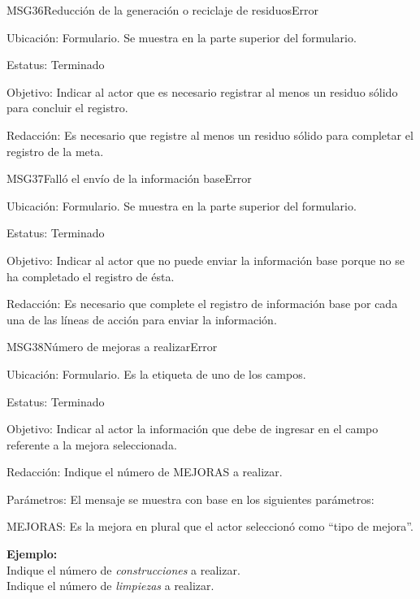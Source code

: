 \begin{mensaje}{MSG36}{Reducción de la generación o reciclaje de residuos}{Error}
\item[Ubicación:] Formulario. Se muestra en la parte superior del formulario.
\item[Estatus:] Terminado
\item[Objetivo:] Indicar al actor que es necesario registrar al menos un residuo sólido para concluir el registro.
\item[Redacción:] Es necesario que registre al menos un residuo sólido para completar el registro de la meta.
\end{mensaje}

\begin{mensaje}{MSG37}{Falló el envío de la información base}{Error}
\item[Ubicación:] Formulario. Se muestra en la parte superior del formulario.
\item[Estatus:] Terminado
\item[Objetivo:] Indicar al actor que no puede enviar la información base porque no se ha completado el registro de ésta.
\item[Redacción:] Es necesario que complete el registro de información base por cada una de las líneas de acción para enviar la información.
\end{mensaje}
\begin{mensaje}{MSG38}{Número de mejoras a realizar}{Error}
\item[Ubicación:] Formulario. Es la etiqueta de uno de los campos.
\item[Estatus:] Terminado
\item[Objetivo:] Indicar al actor la información que debe de ingresar en el campo referente a la mejora seleccionada.
\item[Redacción:] Indique el número de MEJORAS a realizar.
\item[Parámetros:] El mensaje se muestra con base en los siguientes parámetros:
\begin{Citemize}
	\item MEJORAS: Es la mejora en plural que el actor seleccionó como ``tipo de mejora''.
\end{Citemize}
\item[]{\bf Ejemplo:}\\ 
		Indique el número de {\em construcciones} a realizar.\\
		Indique el número de {\em limpiezas} a realizar.
\end{mensaje}
